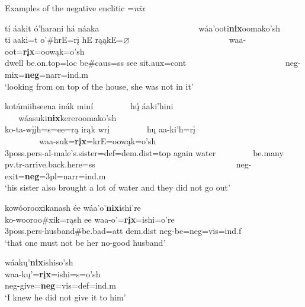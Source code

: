 \begin{exe}

\item\label{negativenix} Examples of the negative enclitic =\textit{nix}

	\begin{xlist}
	
	\item\label{negativenix1}
	\glll tí áakit ó'harani há náaka ~ ~ ~ ~ ~ ~ ~ ~ ~ ~ ~ ~ ~ ~  wáa'ooti\textbf{nix}oomako'sh\\
	ti aaki=t o'\#hrE=rį hE rąąkE=$\varnothing$ ~ ~ ~ ~ ~ ~ ~ ~ ~ ~ ~ ~ ~ ~ waa-oot=\textbf{rįx}=oowąk=o'sh\\
	\textnormal{dwell} \textnormal{be.on.top}=loc \textnormal{be}\#caus=ss \textnormal{see} \textnormal{sit}.aux=cont ~ ~ ~ ~ ~ ~ ~ ~ ~ ~ ~ ~ ~ ~  neg-\textnormal{mix}=\textbf{neg}=narr=ind.m\\
	\glt `looking from on top of the house, she was not in it' \citep[126]{hollow1973a}

	\item\label{negativenix2}
	\glll kotámiihseena inák miní ~ ~ ~ ~ ~ hų́ áaki'hini ~ ~ ~ ~ ~ ~ ~ ~ ~ ~ ~ ~ ~ ~ ~ ~ ~ ~ ~ ~ wáasuki\textbf{nix}kereroomako'sh\\
	ko-ta-wįįh=s=ee=rą irąk wrį ~ ~ ~ ~ ~ hų aa-ki'h=rį ~ ~ ~ ~ ~ ~ ~ ~ ~ ~ ~ ~ ~ ~ ~ ~ ~ ~ ~ ~ waa-suk=\textbf{rįx}=krE=oowąk=o'sh\\
	3poss.pers-al-\textnormal{male's.sister}=def=dem.dist=top \textnormal{again} \textnormal{water} ~ ~ ~ ~ ~ \textnormal{be.many} pv.tr-\textnormal{arrive.back.here}=ss ~ ~ ~ ~ ~ ~ ~ ~ ~ ~ ~ ~ ~ ~ ~ ~ ~ ~ ~ ~ neg-\textnormal{exit}=\textbf{neg}=3pl=narr=ind.m\\
	\glt `his sister also brought a lot of water and they did not go out' \citep[200]{hollow1973a}

	\item\label{negativenix3}
	\glll kowóorooxikanash ée wáa'o'\textbf{nix}ishi're\\
	ko-wooroo\#xik=rąsh ee waa-o'=\textbf{rįx}=ishi=o're\\
	3poss.pers-\textnormal{husband}\#\textnormal{be.bad}=att dem.dist neg-\textnormal{be}=neg=vis=ind.f\\
	\glt `that one must not be her no-good husband' \citep[133]{hollow1973a}

	\item\label{negativenix4}
	\glll wáakų'\textbf{nix}ishiso'sh\\
	waa-kų'=\textbf{rįx}=ishi=s=o'sh\\
	neg-\textnormal{give}=\textbf{neg}=vis=def=ind.m\\
	\glt `I knew he did not give it to him' \citep[441]{hollow1970}


\end{xlist}
\end{exe}
